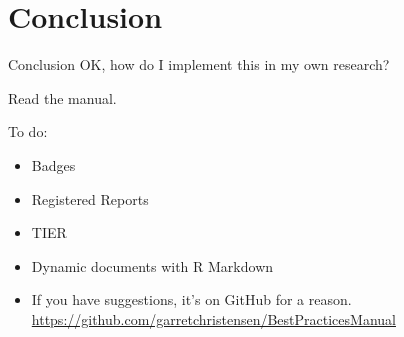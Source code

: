 \documentclass{beamer}
\begin{document}
\section{Conclusion}
\begin{frame}{Conclusion}
OK, how do I implement this in my own research?

Read the manual.

\vspace{0.25in}
To do:
\begin{itemize}[<.->]
\item Badges
\item Registered Reports
\item TIER
\item Dynamic documents with R Markdown
\item If you have suggestions, it's on GitHub for a reason.
\url{https://github.com/garretchristensen/BestPracticesManual}
\end{itemize}
\end{frame}
\end{document}

